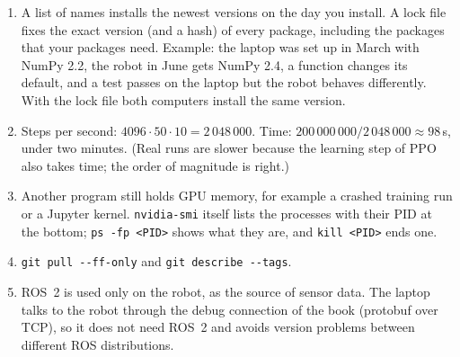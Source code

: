 \begin{enumerate}[label=\textbf{\ansnum.\arabic*}]
  \item A list of names installs the newest versions on the day you install. A lock file fixes the exact version (and a hash) of every package, including the packages that your packages need. Example: the laptop was set up in March with NumPy 2.2, the robot in June gets NumPy 2.4, a function changes its default, and a test passes on the laptop but the robot behaves differently. With the lock file both computers install the same version.
  \item Steps per second: $4096\cdot50\cdot10=2\,048\,000$. Time: $200\,000\,000/2\,048\,000\approx98$\,s, under two minutes. (Real runs are slower because the learning step of PPO also takes time; the order of magnitude is right.)
  \item Another program still holds GPU memory, for example a crashed training run or a Jupyter kernel. \verb!nvidia-smi! itself lists the processes with their PID at the bottom; \verb!ps -fp <PID>! shows what they are, and \verb!kill <PID>! ends one.
  \item \verb!git pull --ff-only! and \verb!git describe --tags!.
  \item ROS~2 is used only on the robot, as the source of sensor data. The laptop talks to the robot through the debug connection of the book (protobuf over TCP), so it does not need ROS~2 and avoids version problems between different ROS distributions.
\end{enumerate}

